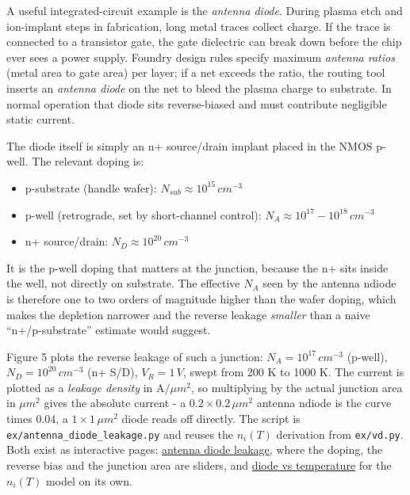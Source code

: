 A useful integrated-circuit example is the \emph{antenna diode}. During
plasma etch and ion-implant steps in fabrication, long metal traces
collect charge. If the trace is connected to a transistor gate, the gate
dielectric can break down before the chip ever sees a power supply.
Foundry design rules specify maximum \emph{antenna ratios} (metal area
to gate area) per layer; if a net exceeds the ratio, the routing tool
inserts an \emph{antenna diode} on the net to bleed the plasma charge to
substrate. In normal operation that diode sits reverse-biased and must
contribute negligible static current.

The diode itself is simply an n+ source/drain implant placed in the NMOS
p-well. The relevant doping is:

\begin{itemize}
\tightlist
\item
  p-substrate (handle wafer): \(N_{sub} \approx 10^{15}\, cm^{-3}\)
\item
  p-well (retrograde, set by short-channel control):
  \(N_A \approx 10^{17}-10^{18}\, cm^{-3}\)
\item
  n+ source/drain: \(N_D \approx 10^{20}\, cm^{-3}\)
\end{itemize}

It is the p-well doping that matters at the junction, because the n+
sits inside the well, not directly on substrate. The effective \(N_A\)
seen by the antenna ndiode is therefore one to two orders of magnitude
higher than the wafer doping, which makes the depletion narrower and the
reverse leakage \emph{smaller} than a naive ``n+/p-substrate'' estimate
would suggest.

Figure 5 plots the reverse leakage of such a junction:
\(N_A = 10^{17}\, cm^{-3}\) (p-well), \(N_D = 10^{20}\, cm^{-3}\) (n+
S/D), \(V_R = 1\, V\), swept from 200 K to 1000 K. The current is
plotted as a \emph{leakage density} in \(\mathrm{A}/\mu m^2\), so
multiplying by the actual junction area in \(\mu m^2\) gives the
absolute current - a \(0.2 \times 0.2\, \mu m^2\) antenna ndiode is the
curve times \(0.04\), a \(1 \times 1\, \mu m^2\) diode reads off
directly. The script is \texttt{ex/antenna\_diode\_leakage.py} and
reuses the \(n_i(T)\) derivation from \texttt{ex/vd.py}. Both exist as
interactive pages:
\href{https://wulffern.github.io/aic2026/assets/examples/antenna-leakage.html}{antenna
diode leakage}, where the doping, the reverse bias and the junction area
are sliders, and
\href{https://wulffern.github.io/aic2026/assets/examples/diode.html}{diode
vs temperature} for the \(n_i(T)\) model on its own.

